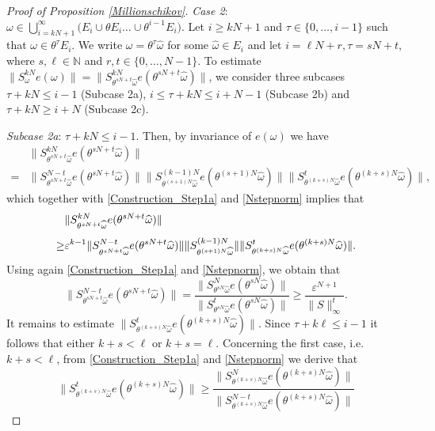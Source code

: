 \documentclass[pdflatex,sn-mathphys-num]{sn-jnl}%
\theoremstyle{thmstyleone}%
\theoremstyle{thmstyletwo}%
\theoremstyle{thmstylethree}%
\newcommand{\N}{\mathbb{N}}
\newcommand{\eps}{\varepsilon}
\numberwithin{equation}{section}
\begin{document}
\begin{proof}[Proof of Proposition \ref{Millionschikov}]
\noindent
\emph{Case 2}: $\omega\in \bigcup_{i=kN+1}^{\infty}  \Big(E_i\cup \theta E_i\dots\cup\theta^{i-1} E_i\Big)$. Let $i\geq kN+1$ and $\tau\in \{0,\dots,i-1\}$ such that $\omega\in\theta^{\tau }E_i$. We write $\omega=\theta^{\tau}\widehat\omega$ for some $\widehat\omega\in E_i$ and let  $i=\ell N+r, \tau=sN+t$, where $s,\ell\in\N$ and $r,t\in \{0,\dots,N-1\}$. To estimate $\|S_{\omega}^{kN}e(\omega)\|=
\|S^{kN}_{\theta^{sN+t}\widehat\omega}e(\theta^{sN+t}\widehat\omega)\|$, we consider three subcases $\tau+kN\leq i-1$ (Subcase 2a), $i\leq \tau+kN\leq i+N-1$ (Subcase 2b) and $\tau+kN\geq i+N$ (Subcase 2c).

\emph{Subcase 2a}: $\tau+kN\leq i-1$. Then, by invariance of $e(\omega)$ we have 
\begin{align*}
&\|S^{kN}_{\theta^{sN+t}\widehat\omega}e(\theta^{sN+t}\widehat\omega)\|\\[1ex]
=&\|S^{N-t}_{\theta^{sN+t}\widehat\omega}e(\theta^{sN+t}\widehat\omega)\|\|S^{(k-1)N}_{\theta^{(s+1)N}\widehat\omega}e(\theta^{(s+1)N}\widehat\omega)\|
\|S^{t}_{\theta^{(k+s)N}\widehat\omega}e(\theta^{(k+s)N}\widehat\omega)\|,
\end{align*}
which together with \eqref{Construction_Step1a} and \eqref{Nstepnorm} implies that 
\begin{align}
&\|S^{kN}_{\theta^{sN+t}\widehat\omega}e(\theta^{sN+t}\widehat\omega)\|\notag
\\[1ex]
\geq& 
\eps^{k-1} \|S^{N-t}_{\theta^{sN+t}\widehat\omega}e(\theta^{sN+t}\widehat\omega)\|\|S^{(k-1)N}_{\theta^{(s+1)N}\widehat\omega}\|
\|S^{t}_{\theta^{(k+s)N}\widehat\omega}e(\theta^{(k+s)N}\widehat\omega)\|.
\label{Case2a_Eq1}
\end{align}
Using again  \eqref{Construction_Step1a} and \eqref{Nstepnorm}, we obtain that 
\begin{equation}\label{Subcase2a:Eq2}
\|S^{N-t}_{\theta^{sN+t}\widehat\omega}e(\theta^{sN+t}\widehat\omega)\|=\frac{\|S^{N}_{\theta^{sN}\widehat\omega}e(\theta^{sN}\widehat\omega)\|}{\|S^{t}_{\theta^{sN}\widehat\omega}e(\theta^{sN}\widehat\omega)\|}
\geq 
\frac{\eps^{N+1}}{\|S\|_{\infty}^t}.
\end{equation}
It remains to estimate $\|S^{t}_{\theta^{(k+s)N}\widehat\omega}e(\theta^{(k+s)N}\widehat\omega)\|$. Since $\tau+k\ell\leq i-1$ it follows that  either $k+s<\ell$ or $k+s=\ell$. Concerning the first case, i.e. $k+s<\ell$, from  \eqref{Construction_Step1a} and \eqref{Nstepnorm} we derive that 
\[
\|S^{t}_{\theta^{(k+s)N}\widehat\omega}e(\theta^{(k+s)N}\widehat\omega)\|
\geq 
\frac{\|S^{N}_{\theta^{(k+s)N}\widehat\omega}e(\theta^{(k+s)N}\widehat\omega)\|}{\|S^{N-t}_{\theta^{(k+s)N}\widehat\omega}e(\theta^{(k+s)N}\widehat\omega)\|}
\]
\end{proof}
\end{document}
